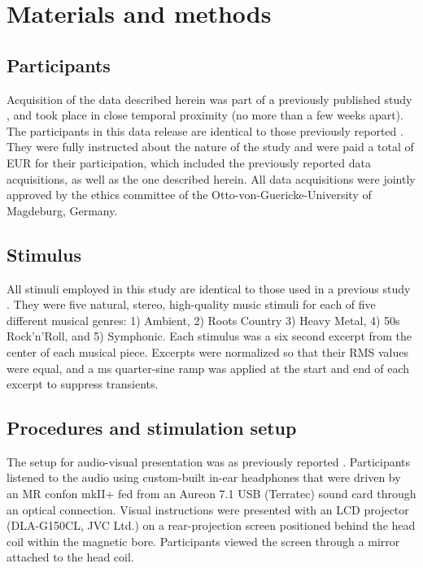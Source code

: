\section*{Materials and methods}
\subsection*{Participants}

Acquisition of the data described herein was part of a previously published
study \cite{HBI+14}, and took place in close temporal proximity (no more
than a few weeks apart). The participants in this data release are identical to
those previously reported \cite{HBI+14}.  They were fully instructed about
the nature of the study and were paid a total of \unit[100]{EUR} for their
participation, which included the previously reported data acquisitions, as
well as the one described herein. All data acquisitions were jointly approved
by the ethics committee of the Otto-von-Guericke-University of Magdeburg,
Germany.


\subsection*{Stimulus}

All stimuli employed in this study are identical to those used in a previous
study \cite[for details refer to][]{CTK+2012}. They were five natural,
stereo, high-quality music stimuli for each of five different musical genres:
1) Ambient, 2) Roots Country 3) Heavy Metal, 4) 50s Rock'n'Roll, and 5)
Symphonic.  Each stimulus was a six second excerpt from the center of each
musical piece.  Excerpts were normalized so that their RMS values were equal,
and a \unit[50]{ms} quarter-sine ramp was applied at the start and end of each excerpt
to suppress transients.

\subsection*{Procedures and stimulation setup}

The setup for audio-visual presentation was as previously reported
\cite{HBI+14}. Participants listened to the audio using custom-built in-ear
headphones that were driven by an MR confon mkII+ fed from an Aureon 7.1 USB
(Terratec) sound card through an optical connection.
Visual instructions were presented with an LCD projector (DLA-G150CL, JVC Ltd.)
on a rear-projection screen positioned behind the head coil within the magnetic
bore. Participants viewed the screen through a mirror attached to the head
coil.

